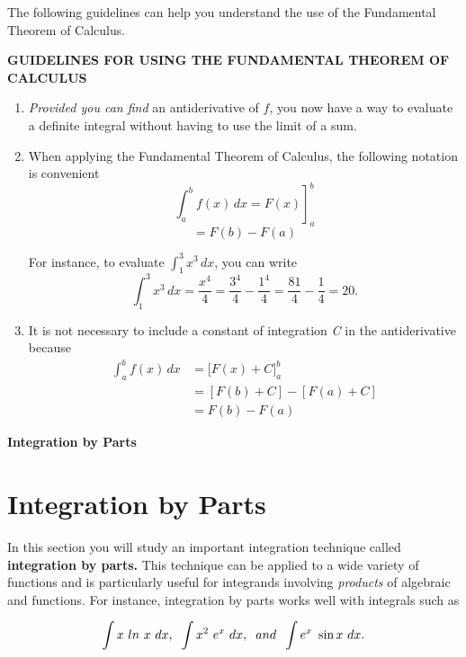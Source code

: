 \documentclass[12pt]{article}
\begin{document}
The following guidelines can help you understand the use of the Fundamental Theorem of Calculus.
\sffamily
\begin{tcolorbox}[colback = beige!75!white,
				  sharp corners = all,
				  colframe = beige!75!white]
\textbf{GUIDELINES FOR USING THE FUNDAMENTAL THEOREM OF CALCULUS}
\rmfamily
\begin{enumerate}
\item \textit{Provided you can find} an antiderivative of $f$, you now have a way to evaluate a definite integral without having to use the limit of a sum.

\item When applying the Fundamental Theorem of Calculus, the following notation is convenient
$$ \left. \int_{a}^{b} f(x) \,dx = F(x) \right]_a^b$$
$$ = F(b) - F(a) $$

For instance, to evaluate $ \int_{1}^{3} x^3 \,dx $, you can write
$$ \int_{1}^{3} x^3 \,dx = \frac{x^4}{4} = \frac{3^4}{4} - \frac{1^4}{4} = \frac{81}{4} - \frac{1}{4} = 20.$$

\item It is not necessary to include a constant of integration \textit{C} in the antiderivative because
\begin{align*}
\int_{a}^{b} f(x) \,dx &= \bigg[ F(x) + C \bigg]_a^b \\
  &= [F(b) + C] - [F(a) + C] \\
 &= F(b) - F(a) 
\end{align*}
\end{enumerate}
\end{tcolorbox}

\pagebreak

\noindent \textbf{\huge Integration by Parts}
\color{mypink}\section*{Integration by Parts}
\color{black} \rmfamily
In this section you will study an important integration technique called \textbf{integration by parts.} This technique can be applied to a wide variety of functions and is particularly useful for integrands involving \textit{products} of algebraic and  functions. For instance, integration by parts works well with integrals such as

$$ \int x\ ln\ x\ dx, \hspace{.2cm} \int x^2\ e^x\ dx, \hspace{.2cm} and \hspace{.2cm} \int e^x\ \sin x\ dx. $$
\end{document}
